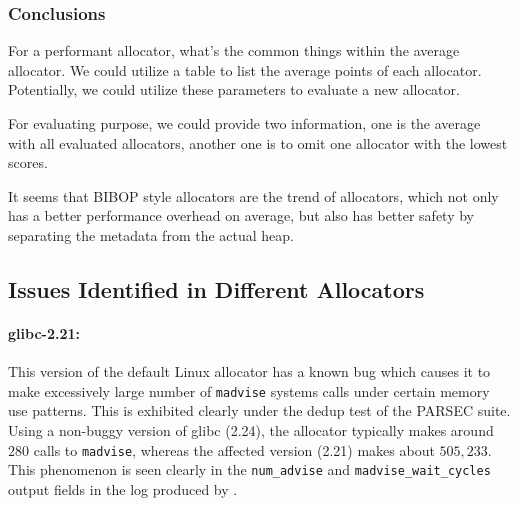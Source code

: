 \subsubsection{Conclusions}

For a performant allocator, what's the common things within the average allocator. We could utilize a table to list the average points of each allocator. Potentially, we could utilize these parameters to evaluate a new allocator. 

For evaluating purpose, we could provide two information, one is the average with all evaluated allocators, another one is to omit one allocator with the lowest scores. 


It seems that BIBOP style allocators are the trend of allocators, which not only has a better performance overhead on average, but also has better safety by separating the metadata from the actual heap. 

\subsection{Issues Identified in Different Allocators}

\paragraph{glibc-2.21:}
This version of the default Linux allocator has a known bug which causes it to make excessively large number of \texttt{madvise} systems calls under certain memory use patterns. This is exhibited clearly under the dedup test of the PARSEC suite.
	Using a non-buggy version of glibc (2.24), the allocator typically makes around $280$ calls to \texttt{madvise}, whereas the affected version (2.21) makes about $505,233$.
	This phenomenon is seen clearly in the \texttt{num\_advise} and \texttt{madvise\_wait\_cycles} output fields in the log produced by \MP{}.



